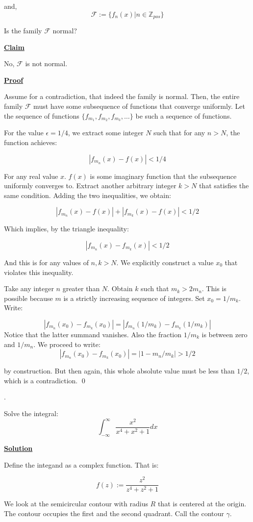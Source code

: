 \documentclass{article}
\newcommand{\new}[1]{
    \vspace{2mm}
    \noindent
    \textbf{
    \underline{#1}}
}
\def\ZZ{{\mathbb{Z}}}
\newcounter{problemcnt}
\newcommand{\Problem}{{
    \vspace{5mm}
    \stepcounter{problemcnt}
    \noindent
    \arabic{problemcnt}. 
}
}
\newcommand{\Proof}{{
    \vspace{2mm}
    \noindent
    \textbf{
    \underline{Proof}}
}
}
\begin{document}
and,
\[
    \mathcal{F}:= \{f_n(x)|n \in \ZZ_{pos}\}
\]

Is the family $\mathcal{F}$ normal?

\new{Claim}
No, $\mathcal{F}$ is not normal. 

\Proof
Assume for a contradiction, that indeed the family is normal. 
Then, the entire family $\mathcal{F}$ must have some subsequence
of functions that converge uniformly. Let the sequence of functions 
$\{f_{m_1}, f_{m_2}, f_{m_3}, \dots \}$ be such a sequence of functions.

For the value $\epsilon = 1/4$, we extract some integer $N$ such that 
for any $n > N$, the function achieves:

\[
    |f_{m_n}(x)-f(x)| < 1/4
\]

For any real value $x$. $f(x)$ is some imaginary function 
that the subsequence uniformly converges to. Extract another 
arbitrary integer $k > N$ that satisfies the same condition. 
Adding the two inequalities, we obtain:

\[
    |f_{m_n}(x)-f(x)| + |f_{m_k}(x)-f(x)| < 1/2
\]

Which implies, by the triangle inequality:

\[
    |f_{m_n}(x) - f_{m_k}(x)| < 1/2
\]

And this is for any values of $n, k > N$. 
We explicitly construct a value $x_0$ that violates 
this inequality. 

Take any integer $n$ greater than $N$. Obtain 
$k$ such that $m_k > 2m_n$. This is possible because 
$m$ is a strictly increasing sequence of integers. 
Set $x_0 = 1/m_k$. Write:

\[
|f_{m_n}(x_0) - f_{m_k}(x_0)| = |f_{m_n}(1/m_k)-f_{m_k}(1/m_k)|
\]
Notice that the latter summand vanishes. Also the fraction 
$1/m_k$ is between zero and $1/m_n$. We proceed to write:
\[
    |f_{m_n}(x_0) - f_{m_k}(x_0)| = |1-m_n/m_k| > 1/2
\]

by construction. But then again, this whole absolute value 
must be less than $1/2$, which is a contradiction. \qed

\newpage

\Problem
Solve the integral:
\[
    \int_{-\infty}^{\infty}\frac{x^2}{x^4+x^2+1}dx
\]

\new{Solution}
Define the integand as a complex function. That is:

\[
    f(z):=\frac{z^2}{z^4+z^2+1}
\]

We look at the semicircular contour with radius $R$
that is centered at the origin. The contour occupies the 
first and the second quadrant. Call the contour $\gamma$. 
\end{document}
